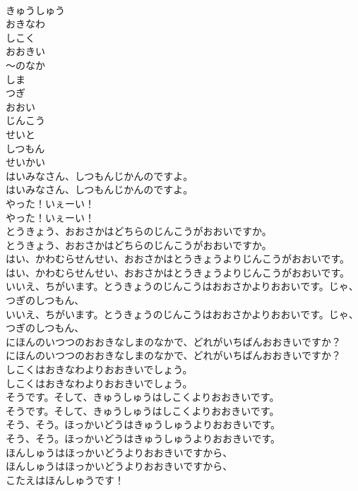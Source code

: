 \documentclass[8pt]{extreport}
\begin{document}
\begin{CJK}{UTF8}{min}
\\	きゅうしゅう
\\	おきなわ
\\	しこく
\\	おおきい
\\	～のなか
\\	しま
\\	つぎ
\\	おおい
\\	じんこう
\\	せいと
\\	しつもん
\\	せいかい
\\	はいみなさん、しつもんじかんのですよ。	
\\	はいみなさん、しつもんじかんのですよ。 
\\	やった！いぇーい！	
\\	やった！いぇーい！ 
\\	とうきょう、おおさかはどちらのじんこうがおおいですか。	
\\	とうきょう、おおさかはどちらのじんこうがおおいですか。 
\\	はい、かわむらせんせい、おおさかはとうきょうよりじんこうがおおいです。	
\\	はい、かわむらせんせい、おおさかはとうきょうよりじんこうがおおいです。 
\\	いいえ、ちがいます。とうきょうのじんこうはおおさかよりおおいです。じゃ、つぎのしつもん、	
\\	いいえ、ちがいます。とうきょうのじんこうはおおさかよりおおいです。じゃ、つぎのしつもん、 
\\	にほんのいつつのおおきなしまのなかで、どれがいちばんおおきいですか？	
\\	にほんのいつつのおおきなしまのなかで、どれがいちばんおおきいですか？ 
\\	しこくはおきなわよりおおきいでしょう。	
\\	しこくはおきなわよりおおきいでしょう。 
\\	そうです。そして、きゅうしゅうはしこくよりおおきいです。	
\\	そうです。そして、きゅうしゅうはしこくよりおおきいです。 
\\	そう、そう。ほっかいどうはきゅうしゅうよりおおきいです。	
\\	そう、そう。ほっかいどうはきゅうしゅうよりおおきいです。 
\\	ほんしゅうはほっかいどうよりおおきいですから、	
\\	ほんしゅうはほっかいどうよりおおきいですから、 
\\	こたえはほんしゅうです！	

\end{CJK}
\end{document}
